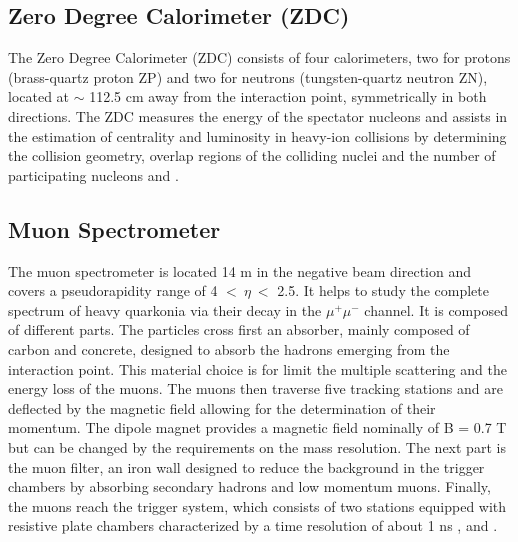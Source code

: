 \documentclass[12pt,a4paper]{book}
\begin{document}
	\subsection{Zero Degree Calorimeter (ZDC)}
	The Zero Degree Calorimeter (ZDC) consists of four calorimeters, two for protons (brass-quartz proton ZP) and two for neutrons (tungsten-quartz neutron ZN), located at $\sim$ 112.5 cm away from the interaction point, symmetrically in both directions. The ZDC measures the energy of the spectator nucleons and assists in the estimation of centrality and luminosity in heavy-ion collisions by determining the collision geometry, overlap regions of the colliding nuclei and the number of participating nucleons \cite{Padhan:2924203} and \cite{amsdottorato9036}.
	
	\subsection{Muon Spectrometer}
	The muon spectrometer is located 14 m in the negative beam direction and covers a pseudorapidity range of 4 $<\ \eta\ <$ 2.5. It helps to study the complete spectrum of heavy quarkonia via their decay in the $\mu^+ \mu^-$ channel. It is composed of different parts. The particles cross first an absorber, mainly composed of carbon and concrete, designed to absorb the hadrons emerging from the interaction point. This material choice is for limit the multiple scattering and the energy loss of the muons. The muons then traverse five tracking stations and are deflected by the magnetic field allowing for the determination of their momentum. The dipole magnet provides a magnetic field nominally of B = 0.7 T but can be changed by the requirements on the mass resolution. The next part is the muon filter, an iron wall designed to reduce the background in the trigger chambers by absorbing secondary hadrons and low momentum muons. Finally, the muons reach the trigger system, which consists of two stations equipped with resistive plate chambers characterized by a time resolution of about 1 ns
	\cite{Padhan:2924203}, \cite{Alicemuonspectometer} and \cite{Herrmann:2920632}.
	
\end{document}

